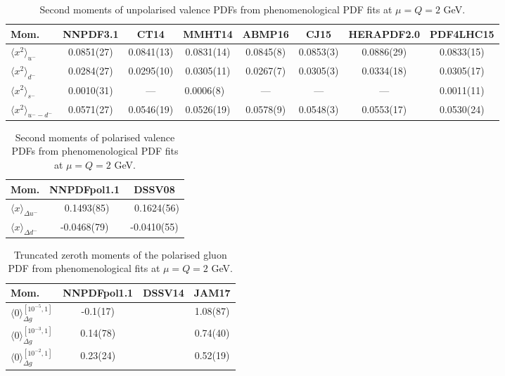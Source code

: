 \begin{table}[!t]
\centering
\small
\begin{tabular}{lccccccc}
\toprule
Mom. & NNPDF3.1 & CT14 & MMHT14 & ABMP16 & CJ15 & HERAPDF2.0 & PDF4LHC15 \\
\midrule
$\langle x^2\rangle_{u^-}$ 
& 0.0851(27) & 0.0841(13) & 0.0831(14)    
& 0.0845(8) & 0.0853(3) & 0.0886(29) & 0.0833(15) \\
$\langle x^2\rangle_{d^-}$
& 0.0284(27) & 0.0295(10) & 0.0305(11)    
& 0.0267(7) & 0.0305(3) & 0.0334(18) & 0.0305(17) \\ 
$\langle x^2\rangle_{s^-}$
& 0.0010(31) & ---        & 0.0006(8)\ \, 
& ---       & ---       & ---        & 0.0011(11) \\
$\langle x^2\rangle_{u^--d^-}$
& 0.0571(27) & 0.0546(19) & 0.0526(19)    
& 0.0578(9) & 0.0548(3) & 0.0553(17) & 0.0530(24) \\
\bottomrule
\end{tabular}
\caption{\small Second moments of unpolarised valence PDFs from 
phenomenological PDF fits at $\mu=Q=2$ GeV.}
\label{tab:unpHmoms}
\end{table}

\begin{table}[!t]
\centering
\footnotesize
\begin{tabular}{lcc}
\toprule
Mom. & NNPDFpol1.1 & DSSV08 \\
\midrule
$\langle x\rangle_{\Delta u^-}$ 
& \ 0.1493(85) & \ 0.1624(56) \\
$\langle x\rangle_{\Delta d^-}$ 
&  -0.0468(79) &  -0.0410(55) \\
\bottomrule
\end{tabular}
\caption{\small Second moments of polarised valence PDFs from phenomenological 
PDF fits at $\mu=Q=2$ GeV.}
\label{tab:polHmoms}
\end{table}

\begin{table}[!t]
\centering
\footnotesize
\begin{tabular}{lccc}
\toprule
Mom. & NNPDFpol1.1 & DSSV14 & JAM17\\
\midrule
$\langle 0\rangle_{\Delta g}^{[10^{-5},1]}$  
& -0.1(17) & & 1.08(87) \\
$\langle 0\rangle_{\Delta g}^{[10^{-3},1]}$  
& 0.14(78) & & 0.74(40) \\
$\langle 0\rangle_{\Delta g}^{[10^{-2},1]}$  
& 0.23(24) & & 0.52(19) \\
\bottomrule
\end{tabular}
\caption{\small Truncated zeroth moments of the polarised gluon PDF from 
phenomenological fits at $\mu=Q=2$ GeV.}
\label{tab:polgmom}
\end{table}
